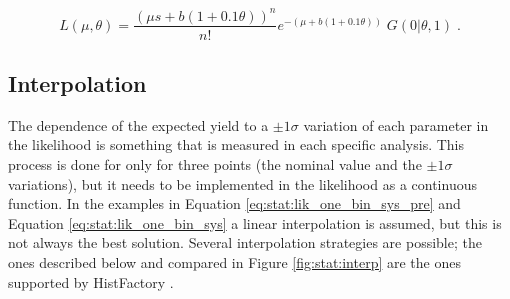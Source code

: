 \begin{equation}
\label{eq:stat:lik_one_bin_sys}
L(\mu, \theta) =
\frac{ (\mu s +
b(1 + 0.1\theta) )^{n} }{ n! }
e^{- (\mu  + b (1 + 0.1\theta) )}   \;
G( 0 | \theta, 1) \; .
\end{equation}

\subsection*{Interpolation}

The dependence of the expected yield to a $\pm 1 \sigma$ variation of each parameter in the likelihood is something that is measured in each specific analysis. This process is done for only for three points (the nominal value and the $\pm 1 \sigma$ variations), but it needs to be implemented in the likelihood as a continuous function. In the examples in Equation \ref{eq:stat:lik_one_bin_sys_pre} and Equation \ref{eq:stat:lik_one_bin_sys} a linear interpolation is assumed, but this is not always the best solution. 
Several interpolation strategies are possible; the ones described below and compared in Figure \ref{fig:stat:interp} are the ones supported by HistFactory \cite{Cranmer:1456844}.
 

